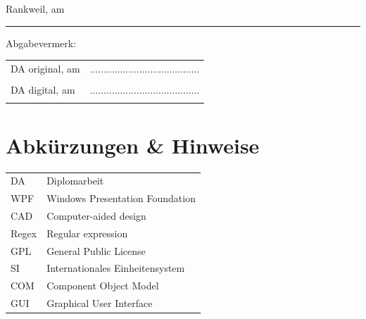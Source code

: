 	\par Rankweil, am \PrintDate \\		

	\noindent\rule{\textwidth}{0.4pt}
	Abgabevermerk:
	\linebreak

	\begin{tabular}{p{7cm}C{6cm}}
		\hspace{1cm} DA original, am \PrintDate & ........................................ \\ 
		& \supervisor \vspace{0.5cm} \\
		
	\hspace{1cm} DA digital, am \PrintDate & ........................................ \\ 
		& \supervisor \\
	\end{tabular}
	
	\pagebreak
	\thispagestyle{empty}
	\cleardoublepage
	\pagebreak
	
	\SecAuth{\emplLastA, \emplLastB, \emplLastC, \emplLastD} %
	
	\fancyfoot[LE,RO]{\thepage}
	\fancyfoot[LO,RE]{\DADate~\textbar~\diplomatitle~\textbar ~\@SecAuth}
	\renewcommand{\footrulewidth}{0.4pt} %
	
	
\pagebreak

\section*{Abkürzungen \& Hinweise}
\begin{singlespace}	
	\begin{tabular}{ll}
		DA     & Diplomarbeit \\
		WPF    & Windows Presentation Foundation \\
		CAD    & Computer-aided design \\
		Regex  & Regular expression \\
		GPL    & General Public License  \\
		SI     & Internationales Einheitensystem \\
		COM    & Component Object Model \\
		GUI    & Graphical User Interface \\
	\end{tabular}
\end{singlespace}

